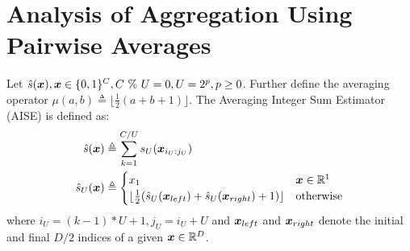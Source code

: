 

\vfill\break  %
\section{Analysis of Aggregation Using Pairwise Averages} \label{sec:aggregateAnalysis}


\begin{definition}
Let $\hat{s}(\bm{x}), \bm{x} \in \{0, 1\}^C, C \text{ \% } U = 0, U = 2^p, p \ge 0$. Further define the averaging operator $\mu(a, b) \triangleq \lfloor \frac{1}{2}(a + b + 1) \rfloor$. The Averaging Integer Sum Estimator (AISE) is defined as:
\begin{align}
    \hat{s}(\bm{x}) &\triangleq \sum_{k=1}^{C / U} s_U(\bm{x}_{i_U:j_U}) \\
    \hat{s}_U(\bm{x}) &\triangleq
        \begin{cases}
            x_1 & \bm{x} \in \mathbb{R}^1 \\
             \lfloor \frac{1}{2}(\hat{s}_U(\bm{x}_{left}) + \hat{s}_U(\bm{x}_{right}) + 1) \rfloor & \text{otherwise}
       \end{cases}
\end{align}
where $i_U = (k-1)*U+1, j_U = i_U + U$ and $\bm{x}_{left}$ and $\bm{x}_{right}$ denote the initial and final $D/2$ indices of a given $\bm{x} \in \mathbb{R}^D$.
\end{definition}


